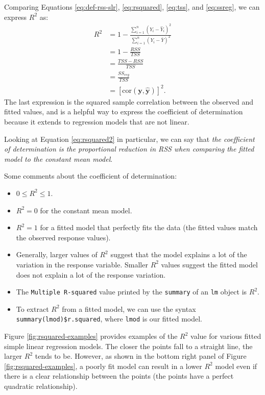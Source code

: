 \documentclass[
]{book}
\providecommand{\tightlist}{%
  \setlength{\itemsep}{0pt}\setlength{\parskip}{0pt}}
\theoremstyle{definition}
\theoremstyle{definition}
\theoremstyle{definition}
\theoremstyle{definition}
\theoremstyle{remark}
\begin{document}
Comparing Equations \eqref{eq:def-rss-slr}, \eqref{eq:rsquared}, \eqref{eq:tss}, and \eqref{eq:ssreg}, we can express \(R^2\) as:
\[
\begin{aligned}
R^2 &= 1-\frac{\sum_{i=1}^n (Y_i-\hat{Y}_i)^2}{\sum_{i=1}^n (Y_i-\bar{Y})^2} \\
&= 1 - \frac{RSS}{TSS} \\
&= \frac{TSS - RSS}{TSS} \\
&= \frac{SS_{reg}}{TSS} \\
&= [\mathrm{cor}(\mathbf{y}, \hat{\mathbf{y}})]^2.
\end{aligned}
\label{eq:rsquared2}
\]
The last expression is the squared sample correlation between the observed and fitted values, and is a helpful way to express the coefficient of determination because it extends to regression models that are not linear.

Looking at Equation \eqref{eq:rsquared2} in particular, we can say that \emph{the coefficient of determination is the proportional reduction in RSS when comparing the fitted model to the constant mean model}.

Some comments about the coefficient of determination:

\begin{itemize}
\tightlist
\item
  \(0\leq R^2 \leq 1\).
\item
  \(R^2=0\) for the constant mean model.
\item
  \(R^2=1\) for a fitted model that perfectly fits the data (the fitted values match the observed response values).
\item
  Generally, larger values of \(R^2\) suggest that the model explains a lot of the variation in the response variable. Smaller \(R^2\) values suggest the fitted model does not explain a lot of the response variation.
\item
  The \texttt{Multiple\ R-squared} value printed by the \texttt{summary} of an \texttt{lm} object is \(R^2\).
\item
  To extract \(R^2\) from a fitted model, we can use the syntax \texttt{summary(lmod)\$r.squared}, where \texttt{lmod} is our fitted model.
\end{itemize}

Figure \ref{fig:rsquared-examples} provides examples of the \(R^2\) value for various fitted simple linear regression models. The closer the points fall to a straight line, the larger \(R^2\) tends to be. However, as shown in the bottom right panel of Figure \ref{fig:rsquared-examples}, a poorly fit model can result in a lower \(R^2\) model even if there is a clear relationship between the points (the points have a perfect quadratic relationship).
\end{document}
